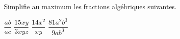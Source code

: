 %
%
Simplifie au maximum les fractions algébriques suivantes.
  \begin{tasks}
    \task $\dfrac{ab}{ac}$
    \task $\dfrac{15xy}{3xyz}$
    \task $\dfrac{14x^{2}}{xy}$
    \task $\dfrac{81a^{2}b^{3}}{9ab^3}$
  \end{tasks}
